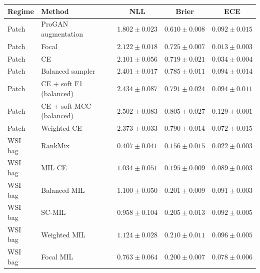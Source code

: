 \begin{tabular}{llccc}
\toprule
Regime & Method & NLL & Brier & ECE\\
\midrule
Patch & ProGAN augmentation & $1.802 \pm 0.023$ & $0.610 \pm 0.008$ & $0.092 \pm 0.015$\\
Patch & Focal & $2.122 \pm 0.018$ & $0.725 \pm 0.007$ & $0.013 \pm 0.003$\\
Patch & CE & $2.101 \pm 0.056$ & $0.719 \pm 0.021$ & $0.034 \pm 0.004$\\
Patch & Balanced sampler & $2.401 \pm 0.017$ & $0.785 \pm 0.011$ & $0.094 \pm 0.014$\\
Patch & CE + soft F1 (balanced) & $2.434 \pm 0.087$ & $0.791 \pm 0.024$ & $0.094 \pm 0.011$\\
Patch & CE + soft MCC (balanced) & $2.502 \pm 0.083$ & $0.805 \pm 0.027$ & $0.129 \pm 0.001$\\
Patch & Weighted CE & $2.373 \pm 0.033$ & $0.790 \pm 0.014$ & $0.072 \pm 0.015$\\
\addlinespace
WSI bag & RankMix & $0.407 \pm 0.041$ & $0.156 \pm 0.015$ & $0.022 \pm 0.003$\\
WSI bag & MIL CE & $1.034 \pm 0.051$ & $0.195 \pm 0.009$ & $0.089 \pm 0.003$\\
WSI bag & Balanced MIL & $1.100 \pm 0.050$ & $0.201 \pm 0.009$ & $0.091 \pm 0.003$\\
WSI bag & SC-MIL & $0.958 \pm 0.104$ & $0.205 \pm 0.013$ & $0.092 \pm 0.005$\\
WSI bag & Weighted MIL & $1.124 \pm 0.028$ & $0.210 \pm 0.011$ & $0.096 \pm 0.005$\\
WSI bag & Focal MIL & $0.763 \pm 0.064$ & $0.200 \pm 0.007$ & $0.078 \pm 0.006$\\
\bottomrule
\end{tabular}
